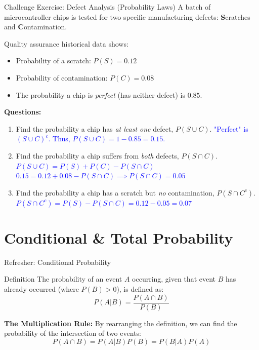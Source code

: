 \documentclass[aspectratio=169]{beamer}
\begin{document}
\begin{frame}{Challenge Exercise: Defect Analysis (Probability Laws)}
    A batch of microcontroller chips is tested for two specific manufacturing defects: \textbf{S}cratches and \textbf{C}ontamination.
    \vspace{0.2cm}

    Quality assurance historical data shows:
    \begin{itemize}
        \item Probability of a scratch: $P(S) = 0.12$
        \item Probability of contamination: $P(C) = 0.08$
        \item The probability a chip is \emph{perfect} (has neither defect) is $0.85$.
    \end{itemize}
    \vspace{0.2cm}

    \textbf{Questions:}
    \begin{enumerate}
        \item Find the probability a chip has \emph{at least one} defect, $P(S \cup C)$. \pause 
        \newline \textcolor{blue}{"Perfect" is $(S \cup C)^c$. Thus, $P(S \cup C) = 1 - 0.85 = 0.15$.} \pause
        
        \item Find the probability a chip suffers from \emph{both} defects, $P(S \cap C)$. \pause 
        \newline \textcolor{blue}{$P(S \cup C) = P(S) + P(C) - P(S \cap C)$}
        \newline \textcolor{blue}{$0.15 = 0.12 + 0.08 - P(S \cap C) \implies P(S \cap C) = 0.05$} \pause
        
        \item Find the probability a chip has a scratch but \emph{no} contamination, $P(S \cap C^c)$. \pause 
        \newline \textcolor{blue}{$P(S \cap C^c) = P(S) - P(S \cap C) = 0.12 - 0.05 = 0.07$}
    \end{enumerate}
\end{frame}

\section{Conditional \& Total Probability}

\begin{frame}{Refresher: Conditional Probability}
    \begin{block}{Definition}
        The probability of an event $A$ occurring, given that event $B$ has already occurred (where $P(B) > 0$), is defined as:
        $$ P(A|B) = \frac{P(A \cap B)}{P(B)} $$
    \end{block}
    
    \vspace{0.3cm}
    \textbf{The Multiplication Rule:}
    By rearranging the definition, we can find the probability of the intersection of two events:
    $$ P(A \cap B) = P(A|B)P(B) = P(B|A)P(A) $$
\end{frame}
\end{document}
